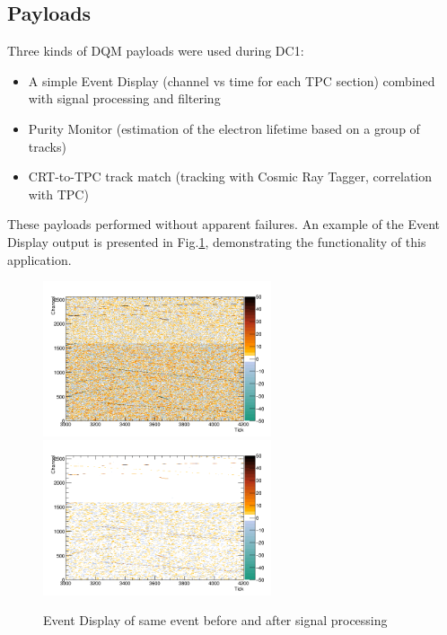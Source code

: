 \documentclass[pdftex,12pt,letter]{article}
\begin{document}
\subsection{Payloads}
Three kinds of DQM payloads were used during DC1:
\begin{itemize}

\item A simple Event Display (channel vs time for each TPC section) combined with signal processing
and filtering
\item Purity Monitor (estimation of the electron lifetime based on a group of tracks)

\item CRT-to-TPC track match (tracking with Cosmic Ray Tagger, correlation with TPC)

\end{itemize}
\noindent These payloads performed without apparent failures. An example of the Event Display output
is presented in Fig.\ref{fig:evdisp}, demonstrating the functionality of this application.
\begin{figure}[tbh]
  \centering
  \includegraphics[width=0.6\textwidth]{./ReportImages/adcraw_evt33_ch0-2559.png}
  \includegraphics[width=0.6\textwidth]{./ReportImages/adcprep_evt33_ch0-2559.png}

  \caption{Event Display of same event before and after signal processing}
  \label{fig:evdisp}
\end{figure}
\end{document}
